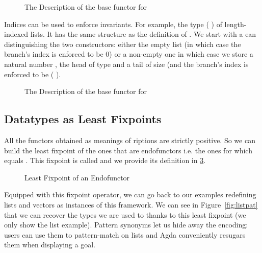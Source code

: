 \begin{figure}[h]
\caption{The Description of the base functor for  }
\label{figure:listD}
\end{figure}

Indices can be used to enforce invariants. For example, the type
({  }) of length-indexed lists. It has the
same structure as the definition of .
We start with a ean distinguishing the two constructors: either
the empty list (in which case the branch's index is enforced to be $0$) or a
non-empty one in which case we store a natural number , the head of type
 and a tail of size  (and the branch's index is enforced to be
( ).

\begin{figure}[h]
\caption{The Description of the base functor for   }\label{figure:vecD}
\end{figure}

\subsection{Datatypes as Least Fixpoints}

All the functors obtained as meanings of riptions are strictly
positive. So we can build the least fixpoint of the ones that are
endofunctors i.e. the ones for which  equals . This fixpoint
is called  and we provide its definition in \cref{figure:datamu}.

\begin{figure}[h]
\caption{Least Fixpoint of an Endofunctor}\label{figure:datamu}
\end{figure}

Equipped with this fixpoint operator, we can go back to our examples
redefining lists and vectors as instances of this framework. We can
see in Figure~\ref{fig:listpat} that we can recover the types we are
used to thanks to this least fixpoint (we only show the list example).
%
Pattern synonyms let us hide away the encoding: users can use them
to pattern-match on lists and Agda conveniently resugars them when
displaying a goal.

